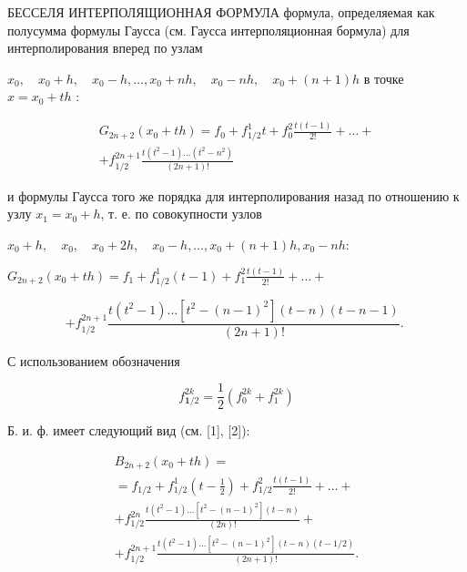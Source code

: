 \documentclass[10pt]{article}
\begin{document}
БЕССЕЛЯ ИНТЕРПОЛЯЩИОННАЯ ФОРМУЛА формула, определяемая как полусумма формулы Гаусса (см. Гаусса интерполяционная бормула) для интерполирования вперед по узлам



$x_{0}, \quad x_{0}+h, \quad x_{0}-h, \ldots, x_{0}+n h, \quad x_{0}-n h, \quad x_{0}+(n+1) h$ в точке $x=x_{0}+t h$ :



\[

\begin{gathered}

G_{2 n+2}\left(x_{0}+t h\right)=f_{0}+f_{1 / 2}^{1} t+f_{0}^{2} \frac{t(t-1)}{2 !}+\ldots+ \\

+f_{1 / 2}^{2 n+1} \frac{t\left(t^{2}-1\right) \ldots\left(t^{2}-n^{2}\right)}{(2 n+1) !}

\end{gathered}

\]



и формулы Гаусса того же порядка для интерполирования назад по отношению к узлу $x_{1}=x_{0}+h$, т. е. по совокупности узлов



$x_{0}+h, \quad x_{0}, \quad x_{0}+2 h, \quad x_{0}-h, \ldots, x_{0}+(n+1) h, x_{0}-n h:$



$G_{2 n+2}\left(x_{0}+t h\right)=f_{1}+f_{1 / 2}^{1}(t-1)+f_{1}^{2} \frac{t(t-1)}{2 !}+\ldots+$



\[

+f_{1 / 2}^{2 n+1} \frac{t\left(t^{2}-1\right) \ldots\left[t^{2}-(n-1)^{2}\right](t-n)(t-n-1)}{(2 n+1) !} \text {. }

\]



С использованием обозначения



\[

f_{\mathbf{1} / 2}^{2 k}=\frac{1}{2}\left(f_{0}^{2 k}+f_{1}^{2 k}\right)

\]



Б. и. ф. имеет следующий вид (см. [1], [2]):



\[

\begin{gathered}

B_{2 n+2}\left(x_{0}+t h\right)= \\

=f_{1 / 2}+f_{1 / 2}^{1}\left(t-\frac{1}{2}\right)+f_{1 / 2}^{2} \frac{t(t-1)}{2 !}+\ldots+ \\

+f_{1 / 2}^{2 n} \frac{t\left(t^{2}-1\right) \ldots\left[t^{2}-(n-1)^{2}\right](t-n)}{(2 n) !}+ \\

+f_{1 / 2}^{2 n+1} \frac{t\left(t^{2}-1\right) \ldots\left[t^{2}-(n-1)^{2}\right](t-n)(t-1 / 2)}{(2 n+1) !} .

\end{gathered}

\]
\end{document}
